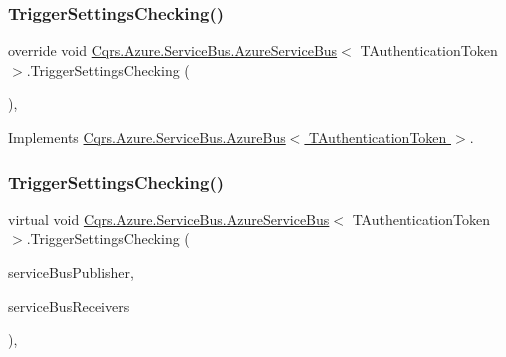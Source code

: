 \subsubsection{\texorpdfstring{Trigger\+Settings\+Checking()}{TriggerSettingsChecking()}\hspace{0.1cm}{\footnotesize\ttfamily [1/2]}}
{\footnotesize\ttfamily override void \hyperlink{classCqrs_1_1Azure_1_1ServiceBus_1_1AzureServiceBus}{Cqrs.\+Azure.\+Service\+Bus.\+Azure\+Service\+Bus}$<$ T\+Authentication\+Token $>$.Trigger\+Settings\+Checking (\begin{DoxyParamCaption}{ }\end{DoxyParamCaption})\hspace{0.3cm}{\ttfamily [protected]}, {\ttfamily [virtual]}}



Implements \hyperlink{classCqrs_1_1Azure_1_1ServiceBus_1_1AzureBus_ae501f84c4983bfa3b2ae4551749ac998}{Cqrs.\+Azure.\+Service\+Bus.\+Azure\+Bus$<$ T\+Authentication\+Token $>$}.

\mbox{\label{classCqrs_1_1Azure_1_1ServiceBus_1_1AzureServiceBus_a31ea4f3f8f5acea0225909611097297e}} 
\subsubsection{\texorpdfstring{Trigger\+Settings\+Checking()}{TriggerSettingsChecking()}\hspace{0.1cm}{\footnotesize\ttfamily [2/2]}}
{\footnotesize\ttfamily virtual void \hyperlink{classCqrs_1_1Azure_1_1ServiceBus_1_1AzureServiceBus}{Cqrs.\+Azure.\+Service\+Bus.\+Azure\+Service\+Bus}$<$ T\+Authentication\+Token $>$.Trigger\+Settings\+Checking (\begin{DoxyParamCaption}\item[{Topic\+Client}]{service\+Bus\+Publisher,  }\item[{I\+Dictionary$<$ int, Subscription\+Client $>$}]{service\+Bus\+Receivers }\end{DoxyParamCaption})\hspace{0.3cm}{\ttfamily [protected]}, {\ttfamily [virtual]}}



